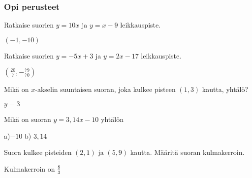 \begin{tehtavasivu}

\subsubsection*{Opi perusteet}

\begin{tehtava}
\begin{vastaus}
\end{vastaus}
\end{tehtava}

\begin{tehtava}
Ratkaise suorien $y=10x$ ja $y=x-9$ leikkauspiste.
\begin{vastaus}
$(-1, -10)$
\end{vastaus}
\end{tehtava}

\begin{tehtava}
Ratkaise suorien $y=-5x+3$ ja $y=2x-17$ leikkauspiste.
\begin{vastaus}
$(\frac{20}{7}, -\frac{79}{70})$
\end{vastaus}
\end{tehtava}

\begin{tehtava}
Mikä on $x$-akselin suuntaisen suoran, joka kulkee pisteen $(1, 3)$ kautta, yhtälö?
\begin{vastaus}
$y=3$
\end{vastaus}
\end{tehtava}

\begin{tehtava}
Mikä on suoran $y=3,14x-10$ yhtälön
\begin{vastaus}
a)$-10$ b) $3,14$
\end{vastaus}
\end{tehtava}

\begin{tehtava}
Suora kulkee pisteiden $(2, 1)$ ja $(5, 9)$ kautta. Määritä suoran kulmakerroin.
\begin{vastaus}
Kulmakerroin on $\frac{8}{3}$
\end{vastaus}
\end{tehtava}


\end{tehtavasivu}
